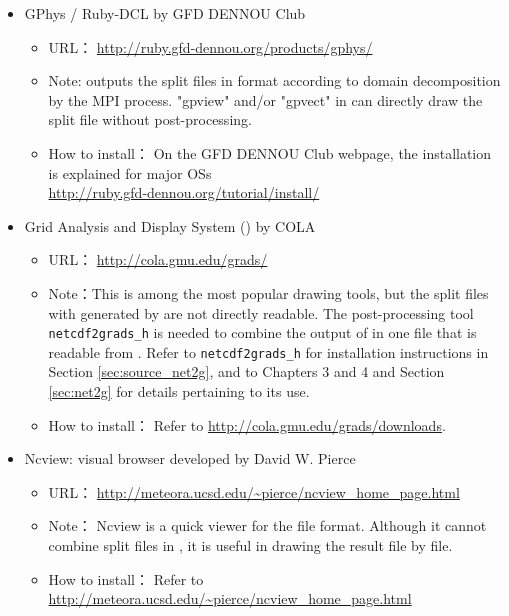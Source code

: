 \begin{itemize}
\item GPhys / Ruby-DCL by GFD DENNOU Club
 \begin{itemize}
  \item URL： \url{http://ruby.gfd-dennou.org/products/gphys/}
  \item Note: \scalelib outputs the split files
  in {\netcdf} format according to domain decomposition by the MPI process.
  "gpview" and/or "gpvect" in {\gphys} can directly draw the split file without post-processing.
  \item How to install：
  On the GFD DENNOU Club webpage, the installation is explained for major OSs\\
  \url{http://ruby.gfd-dennou.org/tutorial/install/}\\
   \end{itemize}
\item Grid Analysis and Display System (\grads) by COLA
 \begin{itemize}
  \item URL： \url{http://cola.gmu.edu/grads/}
  \item Note：This is among the most popular drawing tools,
  but the split files with {\netcdf} generated by \scalelib are not directly readable.
  The post-processing tool \verb|netcdf2grads_h| is needed to combine the output of \scalelib in one file that is readable from \grads. Refer to \verb|netcdf2grads_h| for installation instructions in Section \ref{sec:source_net2g}, and to Chapters 3 and 4 and Section \ref{sec:net2g} for details pertaining to its use.
  \item How to install： Refer to \url{http://cola.gmu.edu/grads/downloads}.
 \end{itemize}
\item Ncview: {\netcdf} visual browser developed by David W. Pierce
 \begin{itemize}
  \item URL： \url{http://meteora.ucsd.edu/~pierce/ncview_home_page.html}
  \item Note： Ncview is a quick viewer for the {\netcdf} file format.
  Although it cannot combine split files in \scalelib, it is useful in drawing the result file by file.
  \item How to install： Refer to \url{http://meteora.ucsd.edu/~pierce/ncview_home_page.html}
 \end{itemize}
\end{itemize}


